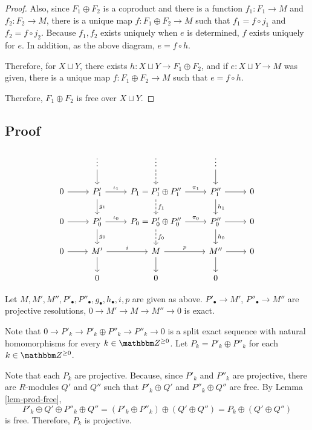 \begin{proof}
  Also, since \(F_1 \oplus F_2\) is a coproduct and there is a function \(f_1: F_1 \to M\) and \(f_2: F_2 \to M\), there is a unique map \(f: F_1 \oplus F_2 \to M\) such that \(f_1 = f \circ j_1\) and \(f_2 = f \circ j_2\). Because \(f_1, f_2\) exists uniquely when \(e\) is determined, \(f\) exists uniquely for \(e\).
  In addition, as the above diagram, \(e = f \circ h\).

  Therefore, for \(X \sqcup Y\), there exists \(h: X \sqcup Y \to F_1 \oplus F_2\),
  and if \(e: X \sqcup Y \to M\) was given,
  there is a unique map \(f: F_1 \oplus F_2 \to M\) such that \(e = f \circ h\).

  Therefore, \(F_1 \oplus F_2\) is free over \(X \sqcup Y\).
\end{proof}

\subsection*{Proof}

\[
\begin{tikzcd}
 & \vdots \ar{d} & \vdots \ar[dashed]{d} & \vdots \ar{d} & \\
0 \ar{r} & P'_1 \ar["\iota_1"]{r} \ar["g_1"]{d} & P_1 = P'_1 \oplus P''_1 \ar["\pi_1"]{r} \ar[dashed, "f_1"]{d} & P''_1 \ar{r} \ar["h_1"]{d} & 0 \\
0 \ar{r} & P'_0 \ar["\iota_0"]{r} \ar["g_0"]{d} & P_0 = P'_0 \oplus P''_0 \ar["\pi_0"]{r} \ar[dashed,"f_0"]{d} & P''_0 \ar{r} \ar["h_0"]{d} & 0 \\
0 \ar{r} & M' \ar["i"]{r} \ar{d} & M \ar["p"]{r} \ar{d} & M'' \ar{r} \ar{d} & 0 \\
& 0 & 0 & 0 &
\end{tikzcd}
\]

Let \(M, M', M'', P'_\bullet, P''_\bullet, g_\bullet, h_\bullet, i, p\) are given as above.
\(P'_\bullet \to M'\), \(P''_\bullet \to M''\) are projective resolutions, \(0 \to M' \to M \to M'' \to 0\) is exact.

Note that \(0 \to P'_k \to P'_k \oplus P''_k \to P''_k \to 0\) is a split exact sequence with natural homomorphisms for every \(k \in \bbZ^{\ge 0}\).
Let \(P_k = P'_k \oplus P''_k\) for each \(k \in \bbZ^{\ge 0}\).

Note that each \(P_k\) are projective.
Because, since \(P'_k\) and \(P''_k\) are projective, there are \(R\)-modules \(Q'\) and \(Q''\) such that \(P'_k \oplus Q'\) and \(P''_k \oplus Q''\) are free.
By Lemma \ref{lem-prod-free},
\[P'_k \oplus Q' \oplus P''_k \oplus Q''
  = (P'_k \oplus P''_k) \oplus (Q' \oplus Q'')
  = P_k \oplus (Q' \oplus Q'')\]
is free.
Therefore, \(P_k\) is projective.

